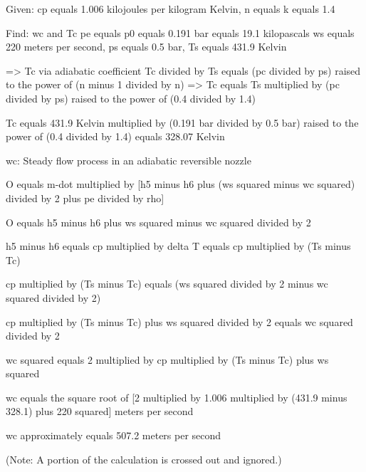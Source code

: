Given:  
cp equals 1.006 kilojoules per kilogram Kelvin, n equals k equals 1.4  

Find: wc and Tc  
pe equals p0 equals 0.191 bar equals 19.1 kilopascals  
ws equals 220 meters per second, ps equals 0.5 bar, Ts equals 431.9 Kelvin  

=> Tc via adiabatic coefficient  
Tc divided by Ts equals (pc divided by ps) raised to the power of (n minus 1 divided by n)  
=> Tc equals Ts multiplied by (pc divided by ps) raised to the power of (0.4 divided by 1.4)  

Tc equals 431.9 Kelvin multiplied by (0.191 bar divided by 0.5 bar) raised to the power of (0.4 divided by 1.4) equals 328.07 Kelvin  

wc:  
Steady flow process in an adiabatic reversible nozzle  

O equals m-dot multiplied by [h5 minus h6 plus (ws squared minus wc squared) divided by 2 plus pe divided by rho]  

O equals h5 minus h6 plus ws squared minus wc squared divided by 2  

h5 minus h6 equals cp multiplied by delta T equals cp multiplied by (Ts minus Tc)  

cp multiplied by (Ts minus Tc) equals (ws squared divided by 2 minus wc squared divided by 2)  

cp multiplied by (Ts minus Tc) plus ws squared divided by 2 equals wc squared divided by 2  

wc squared equals 2 multiplied by cp multiplied by (Ts minus Tc) plus ws squared  

wc equals the square root of [2 multiplied by 1.006 multiplied by (431.9 minus 328.1) plus 220 squared] meters per second  

wc approximately equals 507.2 meters per second  

(Note: A portion of the calculation is crossed out and ignored.)